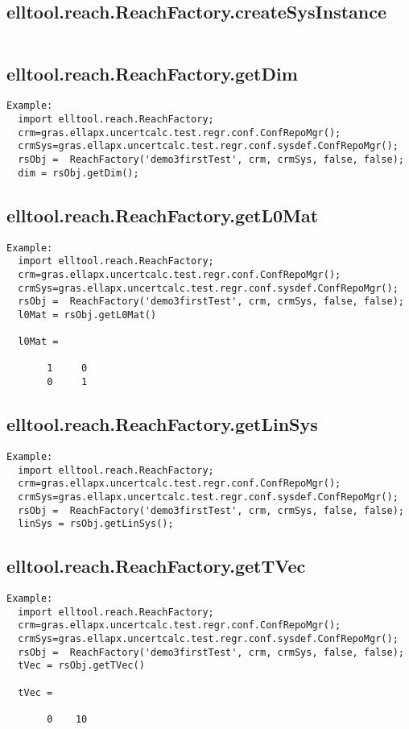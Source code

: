 \subsection{\texorpdfstring{elltool.reach.ReachFactory.createSysInstance}{createSysInstance}}\label{method:elltool.reach.ReachFactory.createSysInstance}
\begin{verbatim}

\end{verbatim}
\subsection{\texorpdfstring{elltool.reach.ReachFactory.getDim}{getDim}}\label{method:elltool.reach.ReachFactory.getDim}
\begin{verbatim}
Example:
  import elltool.reach.ReachFactory;
  crm=gras.ellapx.uncertcalc.test.regr.conf.ConfRepoMgr();
  crmSys=gras.ellapx.uncertcalc.test.regr.conf.sysdef.ConfRepoMgr();
  rsObj =  ReachFactory('demo3firstTest', crm, crmSys, false, false);
  dim = rsObj.getDim();
\end{verbatim}
\subsection{\texorpdfstring{elltool.reach.ReachFactory.getL0Mat}{getL0Mat}}\label{method:elltool.reach.ReachFactory.getL0Mat}
\begin{verbatim}
Example:
  import elltool.reach.ReachFactory;
  crm=gras.ellapx.uncertcalc.test.regr.conf.ConfRepoMgr();
  crmSys=gras.ellapx.uncertcalc.test.regr.conf.sysdef.ConfRepoMgr();
  rsObj =  ReachFactory('demo3firstTest', crm, crmSys, false, false);
  l0Mat = rsObj.getL0Mat()

  l0Mat =

       1     0
       0     1
\end{verbatim}
\subsection{\texorpdfstring{elltool.reach.ReachFactory.getLinSys}{getLinSys}}\label{method:elltool.reach.ReachFactory.getLinSys}
\begin{verbatim}
Example:
  import elltool.reach.ReachFactory;
  crm=gras.ellapx.uncertcalc.test.regr.conf.ConfRepoMgr();
  crmSys=gras.ellapx.uncertcalc.test.regr.conf.sysdef.ConfRepoMgr();
  rsObj =  ReachFactory('demo3firstTest', crm, crmSys, false, false);
  linSys = rsObj.getLinSys();
\end{verbatim}
\subsection{\texorpdfstring{elltool.reach.ReachFactory.getTVec}{getTVec}}\label{method:elltool.reach.ReachFactory.getTVec}
\begin{verbatim}
Example:
  import elltool.reach.ReachFactory;
  crm=gras.ellapx.uncertcalc.test.regr.conf.ConfRepoMgr();
  crmSys=gras.ellapx.uncertcalc.test.regr.conf.sysdef.ConfRepoMgr();
  rsObj =  ReachFactory('demo3firstTest', crm, crmSys, false, false);
  tVec = rsObj.getTVec()

  tVec =

       0    10
\end{verbatim}
